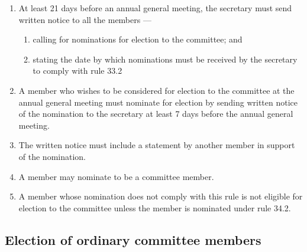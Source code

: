 \documentclass[../constitution.tex]{subfiles}
\begin{document}
\begin{enumerate}

\item At least 21 days before an annual general meeting, the secretary must send written notice to all the members ---

  \begin{enumerate}
  
  \item calling for nominations for election to the committee; and
  \item stating the date by which nominations must be received by the secretary to comply with rule 33.2
  \end{enumerate}
\item A member who wishes to be considered for election to the committee at the annual general meeting must nominate for election by sending written notice of the nomination to the secretary at least 7 days before the annual general meeting.
\item The written notice must include a statement by another member in support of the nomination.
\item A member may nominate to be a committee member.
\item A member whose nomination does not comply with this rule is not eligible for election to the committee unless the member is nominated under rule 34.2.
\end{enumerate}

\hypertarget{election-of-ordinary-committee-members}{%
\subsection{Election of ordinary committee members}\label{election-of-ordinary-committee-members}}
\end{document}

